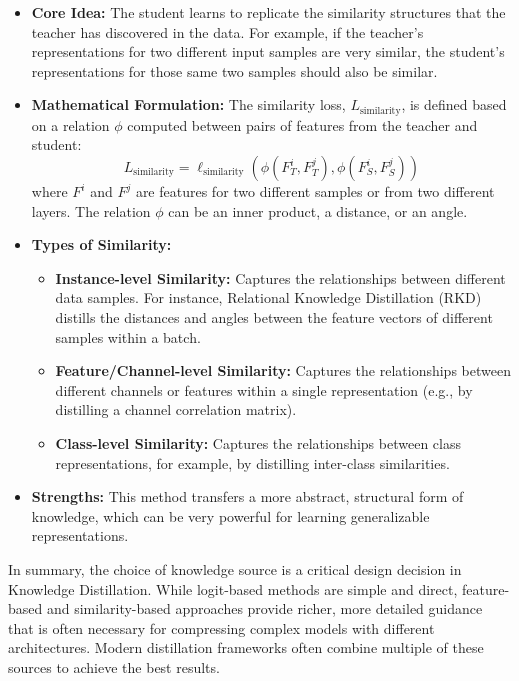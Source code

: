 \begin{itemize}
    \item \textbf{Core Idea:} The student learns to replicate the similarity structures that the teacher has discovered in the data. For example, if the teacher's representations for two different input samples are very similar, the student's representations for those same two samples should also be similar.
    \item \textbf{Mathematical Formulation:} The similarity loss, \(L_{\text{similarity}}\), is defined based on a relation \(\phi\) computed between pairs of features from the teacher and student:
    \[
        L_{\text{similarity}} = \ell_{\text{similarity}}(\phi(F_T^i, F_T^j), \phi(F_S^i, F_S^j))
    \]
    where \(F^i\) and \(F^j\) are features for two different samples or from two different layers. The relation \(\phi\) can be an inner product, a distance, or an angle.
    \item \textbf{Types of Similarity:}
        \begin{itemize}
            \item \textbf{Instance-level Similarity:} Captures the relationships between different data samples. For instance, Relational Knowledge Distillation (RKD) \cite{Park2019} distills the distances and angles between the feature vectors of different samples within a batch.
            \item \textbf{Feature/Channel-level Similarity:} Captures the relationships between different channels or features within a single representation (e.g., by distilling a channel correlation matrix).
            \item \textbf{Class-level Similarity:} Captures the relationships between class representations, for example, by distilling inter-class similarities.
        \end{itemize}
    \item \textbf{Strengths:} This method transfers a more abstract, structural form of knowledge, which can be very powerful for learning generalizable representations.
\end{itemize}

In summary, the choice of knowledge source is a critical design decision in Knowledge Distillation. While logit-based methods are simple and direct, feature-based and similarity-based approaches provide richer, more detailed guidance that is often necessary for compressing complex models with different architectures. Modern distillation frameworks often combine multiple of these sources to achieve the best results.

